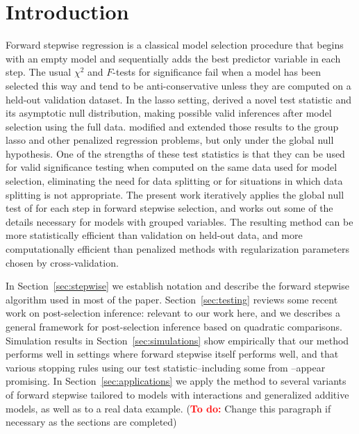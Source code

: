 \documentclass{imsart}
\newcommand{\todo}{\textcolor{red}{\textbf{To do: }}}
\begin{document}
\section{Introduction}
\label{sec:intro}

Forward stepwise regression is a classical model selection procedure
that begins with an empty model and sequentially adds the best predictor
variable in each step. The usual $\chi^2$ and $F$-tests for significance
fail when a model has been selected this way and tend to be
anti-conservative unless they are computed on a held-out validation
dataset. In the lasso setting, \cite{significance:lasso} derived
a novel test statistic and its asymptotic null distribution, making
possible valid inferences after model selection using the full data.
\cite{tests:adaptive} modified and extended those results to the
group lasso \citep{grouplasso} and other penalized regression
problems, but only under the global null hypothesis.
One of the strengths of these test statistics is that they can be
used for valid significance testing when computed on the same
data used for model selection, eliminating the need for data splitting or for situations in which
data splitting is not appropriate.
The present work iteratively applies the global null test
of \cite{tests:adaptive} for each step in forward stepwise selection,
and works out some of the details necessary for
models with grouped variables. The resulting method can
be more statistically efficient than validation on held-out data, and
more computationally efficient than penalized methods with
regularization parameters chosen by cross-validation.


In Section~\ref{sec:stepwise} we establish notation and describe the
forward stepwise algorithm used in most of the paper.
Section~\ref{sec:testing}  reviews some recent work on
post-selection inference: \cite{significance:lasso,tests:adaptive,lasso:fixed}
relevant to our work here, and we describes a general framework
for post-selection inference based on quadratic comparisons.
Simulation results in Section~\ref{sec:simulations} show
empirically that our method performs well in settings where forward
stepwise itself performs well, and that
various stopping rules using our test statistic--including
some from \cite{sequential:fdr}--appear promising. In
Section~\ref{sec:applications} we apply
the method to several variants of forward
stepwise tailored to models with interactions and generalized additive
models, as well as to a real data example.
(\todo Change this paragraph if necessary as the sections are completed)
\end{document}
